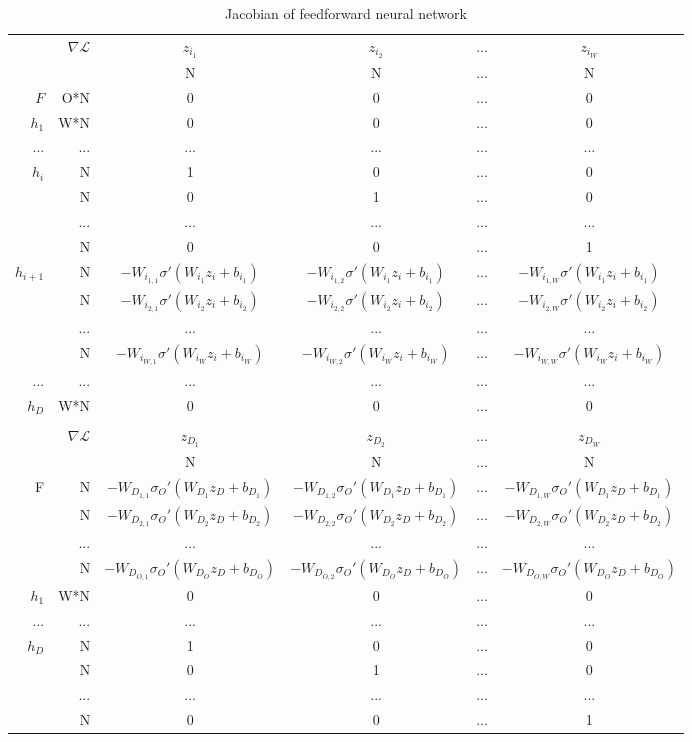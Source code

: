 \begin{adjustwidth}{2000pt}{2000pt}
\begin{table}
\begin{tabular}{ r r | c c c c }
& $\nabla\mathcal{L}$ & $z_{i_1}$ & $z_{i_2}$ &...& $z_{i_W}$\\
& & N & N &...& N \\ \hline
$F$ & O*N & 0 & 0 &...& 0 \\ \hline
$h_1$ & W*N & 0 & 0 &...& 0 \\
...   & ... &...&...&...&...\\\hline
$h_i$ & N & 1 & 0 &...& 0 \\
      & N & 0 & 1 &...& 0  \\
      &...&...&...&...&...\\ 
      & N & 0 & 0 &...& 1  \\ \hline
$h_{i+1}$ & N & $-W_{i_{1,1}}\sigma'(W_{i_1}z_i+b_{i_1})$ & $-W_{i_{1,2}}\sigma'(W_{i_1}z_i+b_{i_1})$ &...& $-W_{i_{1,W}}\sigma'(W_{i_1}z_i+b_{i_1})$\\
          & N & $-W_{i_{2,1}}\sigma'(W_{i_2}z_i+b_{i_2})$ & $-W_{i_{2,2}}\sigma'(W_{i_2}z_i+b_{i_2})$ &...& $-W_{i_{2,W}}\sigma'(W_{i_2}z_i+b_{i_2})$\\
      &...&...&...&...&...\\ 
          & N & $-W_{i_{W,1}}\sigma'(W_{i_W}z_i+b_{i_W})$ & $-W_{i_{W,2}}\sigma'(W_{i_W}z_i+b_{i_W})$ &...& $-W_{i_{W,W}}\sigma'(W_{i_W}z_i+b_{i_W})$\\ \hline
...   & ... &...&...&...&...\\ 
$h_{D}$ & W*N & 0 & 0 &...& 0 \\ \hline \\
& $\nabla\mathcal{L}$ & $z_{D_1}$ & $z_{D_2}$ &...& $z_{D_W}$\\
& & N & N & ... &  N \\ \hline
F & N &         $-W_{D_{1,1}}\sigma_O'(W_{D_1}z_D+b_{D_1})$ & $-W_{D_{1,2}}\sigma_O'(W_{D_1}z_D+b_{D_1})$ &...& $-W_{D_{1,W}}\sigma_O'(W_{D_1}z_D+b_{D_1})$\\
          & N & $-W_{D_{2,1}}\sigma_O'(W_{D_2}z_D+b_{D_2})$ & $-W_{D_{2,2}}\sigma_O'(W_{D_2}z_D+b_{D_2})$ &...& $-W_{D_{2,W}}\sigma_O'(W_{D_2}z_D+b_{D_2})$\\
      &...&...&...&...&...\\ 
          & N & $-W_{D_{O,1}}\sigma_O'(W_{D_O}z_D+b_{D_O})$ & $-W_{D_{O,2}}\sigma_O'(W_{D_O}z_D+b_{D_O})$ &...& $-W_{D_{O,W}}\sigma_O'(W_{D_O}z_D+b_{D_O})$\\ \hline
$h_1$ & W*N & 0 & 0 &...& 0 \\
...   & ... &...&...&...&...\\\hline
$h_D$ & N & 1 & 0 &...& 0 \\
      & N & 0 & 1 &...& 0  \\
      &...&...&...&...&...\\ 
      & N & 0 & 0 &...& 1  \\ \hline
\end{tabular}
\caption{Jacobian of feedforward neural network}
\label{jac-tab}

\end{table}

\end{adjustwidth}
